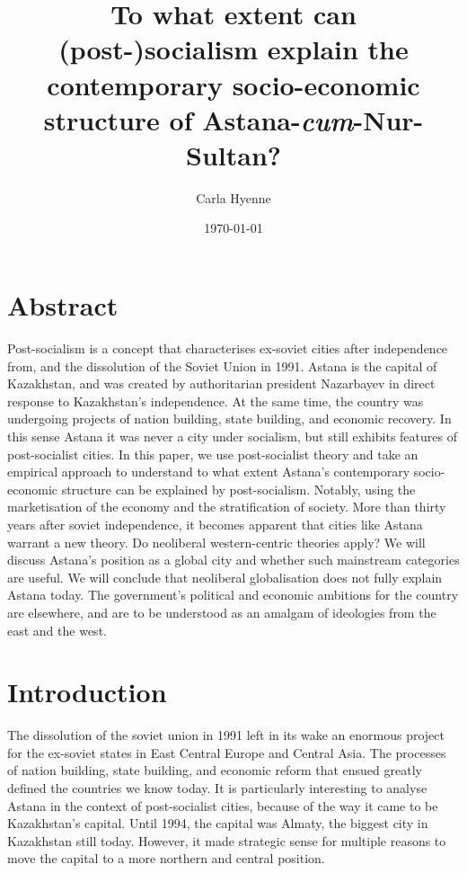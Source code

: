 \documentclass{article}
\title{To what extent can (post-)socialism explain the contemporary socio-economic structure of Astana-\textit{cum}-Nur-Sultan?}
\author{Carla Hyenne}
\date{\today}
\begin{document}
\maketitle 

\section{Abstract}

Post-socialism is a concept that characterises ex-soviet cities after independence from, and the dissolution of the Soviet Union in 1991.
Astana is the capital of Kazakhstan, and was created by authoritarian president Nazarbayev in direct response to Kazakhstan's independence. At the same time, the country was undergoing projects of nation building, state building, and economic recovery. In this sense Astana it was never a city under socialism, but still exhibits features of post-socialist cities. In this paper, we use post-socialist theory and take an empirical approach to understand to what extent Astana's contemporary socio-economic structure can be explained by post-socialism. Notably, using the marketisation of the economy and the stratification of society. 
More than thirty years after soviet independence, it becomes apparent that cities like Astana warrant a new theory. Do neoliberal western-centric theories apply? We will discuss Astana's position as a global city and whether such mainstream categories are useful. We will conclude that neoliberal globalisation does not fully explain Astana today. The government's political and economic ambitions for the country are elsewhere, and are to be understood as an amalgam of ideologies from the east and the west.

\section{Introduction}

The dissolution of the soviet union in 1991 left in its wake an enormous project for the ex-soviet states in East Central Europe and Central Asia. The processes of nation building, state building, and economic reform that ensued greatly defined the countries we know today. It is particularly interesting to analyse Astana in the context of post-socialist cities, because of the way it came to be Kazakhstan's capital. 
Until 1994, the capital was Almaty, the biggest city in Kazakhstan still today. However, it made strategic sense for multiple reasons to move the capital to a more northern and central position. 
\end{document}

